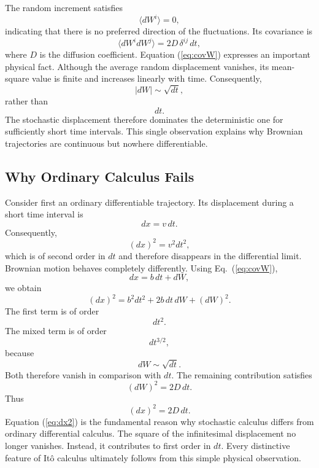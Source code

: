 The random increment satisfies
\begin{equation}
\langle dW^i\rangle =0,
\label{eq:meanW}
\end{equation}
indicating that there is no preferred direction of the fluctuations.
Its covariance is
\begin{equation}
\langle dW^i dW^j\rangle=2D\,\delta^{ij}\,dt,
\label{eq:covW}
\end{equation}
where $D$ is the diffusion coefficient.
Equation (\ref{eq:covW}) expresses an important physical fact.
Although the average random displacement vanishes, its mean-square value
is finite and increases linearly with time.
Consequently,
\[|dW|\sim\sqrt{dt},\]
rather than
\[dt.\]
The stochastic displacement therefore dominates the deterministic one
for sufficiently short time intervals.
This single observation explains why Brownian trajectories are
continuous but nowhere differentiable.
\subsection{Why Ordinary Calculus Fails}
Consider first an ordinary differentiable trajectory.
Its displacement during a short time interval is
\[dx=v\,dt.\]
Consequently,
\[(dx)^2=v^2dt^2,\]
which is of second order in $dt$ and therefore disappears in the
differential limit.
Brownian motion behaves completely differently.
Using Eq.~(\ref{eq:covW}),
\[dx=b\,dt+dW,\]
we obtain
\[(dx)^2=b^2dt^2+2b\,dt\,dW+(dW)^2.\]
The first term is of order
\[dt^2.\]
The mixed term is of order
\[dt^{3/2},\]
because
\[dW\sim\sqrt{dt}.\]
Both therefore vanish in comparison with $dt$.
The remaining contribution satisfies
\[\boxed{(dW)^2=2D\,dt.}\]
Thus
\begin{equation}
(dx)^2=2D\,dt.
\label{eq:dx2}
\end{equation}
Equation (\ref{eq:dx2}) is the fundamental reason why stochastic
calculus differs from ordinary differential calculus.
The square of the infinitesimal displacement no longer vanishes.
Instead, it contributes to first order in $dt$.
Every distinctive feature of It\^o calculus ultimately follows from
this simple physical observation.
